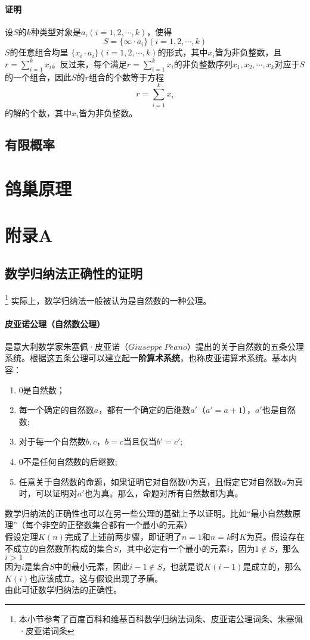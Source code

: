 \documentclass{ctexart}
\begin{document}
   \paragraph{证明}
   设$S$的$k$种类型对象是$a_i(i = 1,2,\cdots,k)$，使得
   \[S = \{\infty \cdot a_i \}(i = 1,2,\cdots,k)\]
   $S$的任意组合均呈 $\{x_i \cdot a_i\}(i = 1,2,\cdots,k)$的形式，其中$x_i$皆为非负整数，且$r = \sum_{i = 1}^k x_i$。反过来，每个满足$r = \sum_{i = 1}^k x_i$的非负整数序列$x_1 , x_2 ,\cdots,x_k$对应于$S$的一个组合，因此$S$的$r$组合的个数等于方程
   \[r = \sum_{i = 1}^k x_i\]
   的解的个数，其中$x_i$皆为非负整数。
   \subsection{有限概率}
   \section{鸽巢原理}
   \section{附录A}
    \subsection{数学归纳法正确性的证明}
    \footnote{本小节参考了百度百科和维基百科数学归纳法词条、皮亚诺公理词条、朱塞佩·皮亚诺词条}
    实际上，数学归纳法一般被认为是自然数的一种公理。
    \paragraph{皮亚诺公理（自然数公理）} 是意大利数学家朱塞佩·皮亚诺（$Giuseppe \ Peano$）提出的关于自然数的五条公理系统。根据这五条公理可以建立起\textbf{一阶算术系统}，也称皮亚诺算术系统。基本内容：
    \begin{enumerate}
        \item 0是自然数；
        \item 每一个确定的自然数$a$，都有一个确定的后继数$a'$（$a' = a+1$），$a'$也是自然数;
        \item 对于每一个自然数$b,c$，$b=c$当且仅当$b' = c'$;
        \item 0不是任何自然数的后继数;
        \item 任意关于自然数的命题，如果证明它对自然数$0$为真，且假定它对自然数$a$为真时，可以证明对$a'$也为真。那么，命题对所有自然数都为真。
    \end{enumerate}
    数学归纳法的正确性也可以在另一些公理的基础上予以证明。比如“最小自然数原理”（每个非空的正整数集合都有一个最小的元素）\\
    假设定理$K(n)$完成了上述前两步骤，即证明了$n = 1$和$n = k$时$K$为真。假设存在不成立的自然数所构成的集合$S$，其中必定有一个最小的元素$i$，因为$1 \notin S$，那么$i > 1$\\
    因为$i$是集合$S$中的最小元素，因此$i - 1 \notin S$，也就是说$K(i -1)$是成立的，那么$K(i)$也应该成立。这与假设出现了矛盾。\\
    由此可证数学归纳法的正确性。
\end{document}

